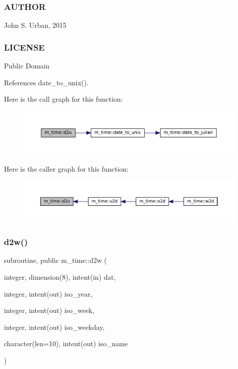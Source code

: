  \subsubsection*{A\+U\+T\+H\+OR}

John S. Urban, 2015 \subsubsection*{L\+I\+C\+E\+N\+SE}

Public Domain 

References date\+\_\+to\+\_\+unix().

Here is the call graph for this function\+:\nopagebreak
\begin{figure}[H]
\begin{center}
\leavevmode
\includegraphics[width=350pt]{namespacem__time_a1506e2889a156387df4481ed0534be81_cgraph}
\end{center}
\end{figure}
Here is the caller graph for this function\+:
\nopagebreak
\begin{figure}[H]
\begin{center}
\leavevmode
\includegraphics[width=350pt]{namespacem__time_a1506e2889a156387df4481ed0534be81_icgraph}
\end{center}
\end{figure}
\mbox{\label{namespacem__time_ad4ff99ad6f6d5282c4b65ad636a2a627}} 
\subsubsection{\texorpdfstring{d2w()}{d2w()}}
{\footnotesize\ttfamily subroutine, public m\+\_\+time\+::d2w (\begin{DoxyParamCaption}\item[{integer, dimension(8), intent(in)}]{dat,  }\item[{integer, intent(out)}]{iso\+\_\+year,  }\item[{integer, intent(out)}]{iso\+\_\+week,  }\item[{integer, intent(out)}]{iso\+\_\+weekday,  }\item[{character(len=10), intent(out)}]{iso\+\_\+name }\end{DoxyParamCaption})}



